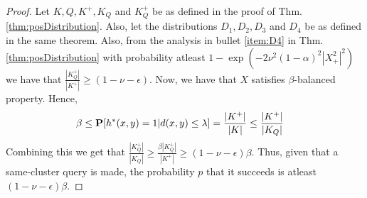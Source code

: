 \posQueriesLSH*
\begin{proof}
Let $K, Q, K^+, K_Q$ and $K_Q^+$ be as defined in the proof of Thm. \ref{thm:posDistribution}. Also, let the distributions $D_1, D_2, D_3$ and $D_4$ be as defined in the same theorem. Also, from the analysis in bullet \ref{item:D4} in Thm. \ref{thm:posDistribution} with probability atleast $1 - \exp(-2\nu^2(1-\alpha)^2|X^2_+|^2)$ we have that $\frac{|K_Q^+|}{|K^+|} \ge (1-\nu-\epsilon)$. Now, we have that $X$ satisfies $\beta$-balanced property. Hence,
\begin{align*}
  &\beta \le \mathbf P[h^*(x, y) = 1 | d(x, y) \le \lambda] = \frac{|K^+|}{|K|} \le \frac{|K^+|}{|K_Q|}
\end{align*}
Combining this we get that $\frac{|K_Q^+|}{|K_Q|} \ge \frac{\beta|K_Q^+|}{|K^+|} \ge (1-\nu-\epsilon)\beta$. Thus, given that a same-cluster query is made, the probability $p$ that it succeeds is atleast $(1-\nu-\epsilon)\beta$.
\end{proof}

